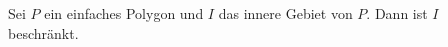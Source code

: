\begin{lemma}
    Sei $P$ ein einfaches Polygon und $I$ das innere Gebiet von $P$. 
    Dann ist $I$ beschränkt.
\end{lemma}